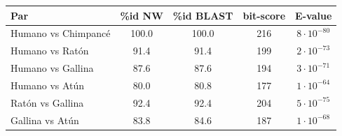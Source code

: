 \begin{tabular}{lcccc}
\toprule
Par & \%id NW & \%id BLAST & bit-score & E-value \\
\midrule
Humano vs Chimpanc\'e & 100.0 & 100.0 & 216 & $8{\cdot}10^{-80}$ \\
Humano vs Rat\'on     & 91.4  & 91.4  & 199 & $2{\cdot}10^{-73}$ \\
Humano vs Gallina     & 87.6  & 87.6  & 194 & $3{\cdot}10^{-71}$ \\
Humano vs At\'un      & 80.0  & 80.8  & 177 & $1{\cdot}10^{-64}$ \\
\alert{Rat\'on vs Gallina}    & \alert{92.4}  & \alert{92.4}  & 204 & $5{\cdot}10^{-75}$ \\
Gallina vs At\'un     & 83.8  & 84.6  & 187 & $1{\cdot}10^{-68}$ \\
\bottomrule
\end{tabular}
